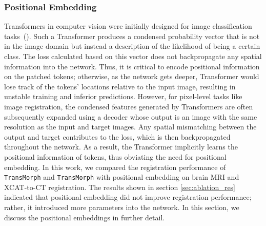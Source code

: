 \documentclass[times,twocolumn,final]{elsarticle}
\begin{document}
\subsubsection{Positional Embedding}
\label{sec:pos_embd}
Transformers in computer vision were initially designed for image classification tasks~(\cite{dosovitskiy2020image, liu2021swin, dong2021cswin, wang2021pyramid}). Such a Transformer produces a condensed probability vector that is not in the image domain but instead a description of the likelihood of being a certain class. The loss calculated based on this vector does not backpropagate any spatial information into the network. Thus, it is critical to encode positional information on the patched tokens; otherwise, as the network gets deeper, Transformer would lose track of the tokens' locations relative to the input image, resulting in unstable training and inferior predictions. However, for pixel-level tasks like image registration, the condensed features generated by Transformers are often subsequently expanded using a decoder whose output is an image with the same resolution as the input and target images. Any spatial mismatching between the output and target contributes to the loss, which is then backpropagated throughout the network. As a result, the Transformer implicitly learns the positional information of tokens, thus obviating the need for positional embedding. In this work, we compared the registration performance of \texttt{TransMorph} and \texttt{TransMorph} with positional embedding on brain MRI and XCAT-to-CT registration. The results shown in section \ref{sec:ablation_res} indicated that positional embedding did not improve registration performance; rather, it introduced more parameters into the network. In this section, we discuss the positional embeddings in further detail.
\end{document}
